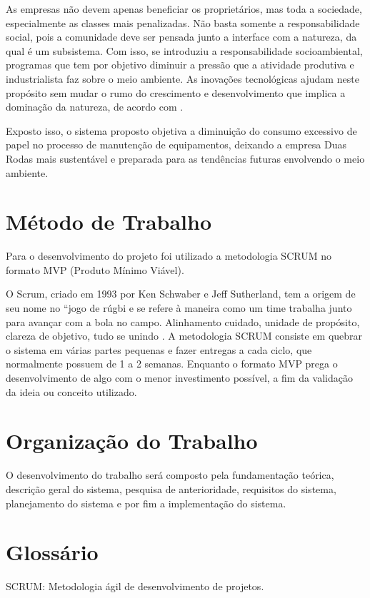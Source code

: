 As empresas não devem apenas beneficiar os proprietários, mas toda a sociedade, especialmente as classes mais penalizadas. Não basta somente a responsabilidade social, pois a comunidade deve ser pensada junto a interface com a natureza, da qual é um subsistema. Com isso, se introduziu a responsabilidade socioambiental, programas que tem por objetivo diminuir a pressão que a atividade produtiva e industrialista faz sobre o meio ambiente. As inovações tecnológicas ajudam neste propósito sem mudar o rumo do crescimento e desenvolvimento que implica a dominação da natureza, de acordo com \cite{boff2017sustentabilidade}.

Exposto isso, o sistema proposto objetiva a diminuição do consumo excessivo de papel no processo de manutenção de equipamentos, deixando a empresa Duas Rodas mais sustentável e preparada para as tendências futuras envolvendo o meio ambiente.

\section{Método de Trabalho}
Para o desenvolvimento do projeto foi utilizado a metodologia SCRUM no formato MVP (Produto Mínimo Viável).

O Scrum, criado em 1993 por Ken Schwaber e Jeff Sutherland, tem a origem de seu nome no “jogo de rúgbi e se refere à maneira como um time trabalha junto para avançar com a bola no campo. Alinhamento cuidado, unidade de propósito, clareza de objetivo, tudo se unindo \cite{rocha2015metodologia}.
A metodologia SCRUM consiste em quebrar o sistema em várias partes pequenas e fazer entregas a cada ciclo, que normalmente possuem de 1 a 2 semanas.
Enquanto o formato MVP prega o desenvolvimento de algo com o menor investimento possível, a fim da validação da ideia ou conceito utilizado.

\section{Organização do Trabalho}

O desenvolvimento do trabalho será composto pela fundamentação teórica, descrição geral do sistema, pesquisa de anterioridade, requisitos do sistema, planejamento do sistema e por fim a implementação do sistema.

\section{Glossário}
SCRUM:		Metodologia ágil de desenvolvimento de projetos.

